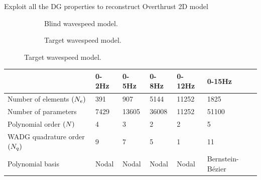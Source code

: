 



\begin{frame}{Exploit all the DG properties to reconstruct Overthrust 2D model}
 \vspace{-0,8cm}
\setlength{\modelwidth}{6.0cm}
\begin{figure}[!htbp]
  \begin{subfigure}{0.5\textwidth}
    \vspace{0.5cm}
    \hspace{-0.5cm}
\renewcommand{\modelfile}{image/mesh_adapt/overthrust_ini}

\caption*{Blind wavespeed model.}
\label{target_model_2}
\end{subfigure}
\hspace{-1cm}
\begin{subfigure}{0.5\textwidth}
\renewcommand{\modelfile}{image/mesh_adapt/overthrust}
\renewcommand{\cmapmin}{2500}
\renewcommand{\cmapmax}{5500}

\vspace{-0.6cm}
\caption*{Target wavespeed model.}
\label{blind_model_2}
\end{subfigure}
\label{overthrust_ini_and_blind}
\end{figure}

\begin{overprint}
  \scriptsize
  \begin{table}[!htbp]
    \centering
    \begin{tabular}{|l|l|l|l|l|l|}
      \hline
      & 0-2Hz & 0-5Hz & 0-8Hz & 0-12Hz & 0-15Hz                               \\ \hline
      Number of elements $({N_e})$   & 391    & 907     &  5144   & 11252     & 1825               \\ \hline
      Number of parameters             & 7429   & 13605   &  36008  & 11252     & 51100              \\ \hline
      Polynomial order $({N})$   & 4      & 3       &  2      & 2         & 5                  \\ \hline
      WADG quadrature order $({N_q})$   & 9      & 7       &  5      & 1         & 11           \\ \hline
      Polynomial basis   & Nodal      & Nodal       &  Nodal      & Nodal         & Bernstein-Bézier \\ \hline
    \end{tabular}
    \label{nb_elem_overthrust}
  \end{table}


\end{overprint}
\end{frame}
